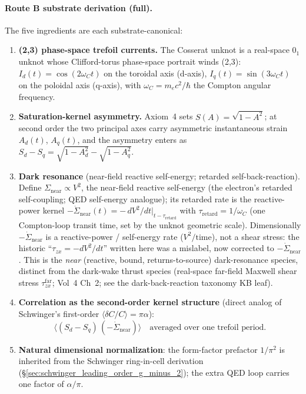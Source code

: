 \paragraph{Route B substrate derivation (full).} The five ingredients are
each substrate-canonical:
\begin{enumerate}
    \item \textbf{(2,3) phase-space trefoil currents.} The Cosserat unknot
    is a real-space $0_1$ unknot whose Clifford-torus phase-space portrait
    winds (2,3): $I_d(t) = \cos(2\omega_C t)$ on the toroidal axis
    (d-axis), $I_q(t) = \sin(3\omega_C t)$ on the poloidal axis (q-axis),
    with $\omega_C = m_e c^2/\hbar$ the Compton angular frequency.
    \item \textbf{Saturation-kernel asymmetry.} Axiom~4 sets
    $S(A) = \sqrt{1-A^2}$; at second order the two principal axes carry
    asymmetric instantaneous strain $A_d(t)$, $A_q(t)$, and the asymmetry
    enters as $S_d - S_q = \sqrt{1-A_d^2} - \sqrt{1-A_q^2}$.
    \item \textbf{Dark resonance} (near-field reactive self-energy;
    retarded self-back-reaction). Define $\Sigma_{\text{near}} \propto V^2$,
    the near-field reactive self-energy (the electron's retarded
    self-coupling; QED self-energy analogue); its retarded rate is the
    reactive-power kernel
    $-\dot{\Sigma}_{\text{near}}(t) = -\,dV^2/dt\big|_{t-\tau_{\text{retard}}}$
    with $\tau_{\text{retard}} = 1/\omega_C$ (one Compton-loop transit time,
    set by the unknot geometric scale). Dimensionally $-\dot{\Sigma}_{\text{near}}$
    is a reactive-power / self-energy rate ($V^2/\text{time}$), not a shear
    stress: the historic ``$\tau_{zx} = -dV^2/dt$'' written here was a mislabel,
    now corrected to $-\dot{\Sigma}_{\text{near}}$. This is the \emph{near}
    (reactive, bound, returns-to-source) dark-resonance species, distinct from
    the dark-wake thrust species (real-space far-field Maxwell shear stress
    $\tau^{\text{far}}_{zx}$; Vol~4 Ch~2; see the dark-back-reaction taxonomy
    KB leaf).
    \item \textbf{Correlation as the second-order kernel structure}
    (direct analog of Schwinger's first-order $\langle \delta C/C\rangle
    = \pi\alpha$):
    \[
        \langle (S_d - S_q)\,(-\dot{\Sigma}_{\text{near}}) \rangle
        \quad\text{averaged over one trefoil period.}
    \]
    \item \textbf{Natural dimensional normalization}: the form-factor
    prefactor $1/\pi^2$ is inherited from the Schwinger ring-in-cell
    derivation (\S\ref{sec:schwinger_leading_order_g_minus_2}); the
    extra QED loop carries one factor of $\alpha/\pi$.
\end{enumerate}

